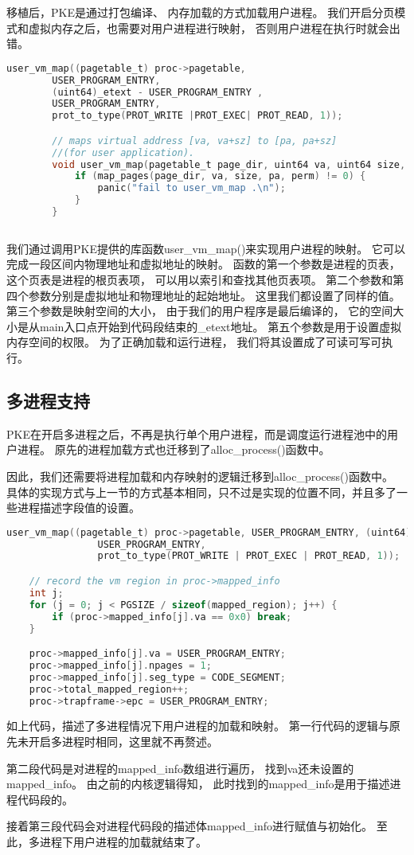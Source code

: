 移植后，PKE是通过打包编译、
内存加载的方式加载用户进程。
我们开启分页模式和虚拟内存之后，也需要对用户进程进行映射，
否则用户进程在执行时就会出错。

\begin{lstlisting}[caption={用户进程地址映射}, label={lst:user_process_map}, language=C]
    user_vm_map((pagetable_t) proc->pagetable,
        USER_PROGRAM_ENTRY, 
        (uint64)_etext - USER_PROGRAM_ENTRY ,
        USER_PROGRAM_ENTRY,
        prot_to_type(PROT_WRITE |PROT_EXEC| PROT_READ, 1)); 

        // maps virtual address [va, va+sz] to [pa, pa+sz] 
        //(for user application).
        void user_vm_map(pagetable_t page_dir, uint64 va, uint64 size, uint64 pa, int perm) {
            if (map_pages(page_dir, va, size, pa, perm) != 0) {
                panic("fail to user_vm_map .\n");
            }
        }
               
\end{lstlisting}

我们通过调用PKE提供的库函数user\_vm\_map()来实现用户进程的映射。
它可以完成一段区间内物理地址和虚拟地址的映射。
函数的第一个参数是进程的页表，这个页表是进程的根页表项，
可以用以索引和查找其他页表项。
第二个参数和第四个参数分别是虚拟地址和物理地址的起始地址。
这里我们都设置了同样的值。
第三个参数是映射空间的大小，
由于我们的用户程序是最后编译的，
它的空间大小是从main入口点开始到代码段结束的\_etext地址。
第五个参数是用于设置虚拟内存空间的权限。
为了正确加载和运行进程，
我们将其设置成了可读可写可执行。


\subsection{多进程支持}

PKE在开启多进程之后，不再是执行单个用户进程，而是调度运行进程池中的用户进程。
原先的进程加载方式也迁移到了alloc\_process()函数中。

因此，我们还需要将进程加载和内存映射的逻辑迁移到alloc\_process()函数中。
具体的实现方式与上一节的方式基本相同，只不过是实现的位置不同，并且多了一些进程描述字段值的设置。

\begin{lstlisting}[caption={多进程情况下用户进程的加载和映射}, label={lst:user_process_map_multi}, language=C]
    user_vm_map((pagetable_t) proc->pagetable, USER_PROGRAM_ENTRY, (uint64) _etext - USER_PROGRAM_ENTRY,
                USER_PROGRAM_ENTRY,
                prot_to_type(PROT_WRITE | PROT_EXEC | PROT_READ, 1));

    // record the vm region in proc->mapped_info
    int j;
    for (j = 0; j < PGSIZE / sizeof(mapped_region); j++) {
        if (proc->mapped_info[j].va == 0x0) break;
    }

    proc->mapped_info[j].va = USER_PROGRAM_ENTRY;
    proc->mapped_info[j].npages = 1;
    proc->mapped_info[j].seg_type = CODE_SEGMENT;
    proc->total_mapped_region++;
    proc->trapframe->epc = USER_PROGRAM_ENTRY;    
\end{lstlisting}

如上代码，描述了多进程情况下用户进程的加载和映射。
第一行代码的逻辑与原先未开启多进程时相同，这里就不再赘述。

第二段代码是对进程的mapped\_info数组进行遍历，
找到va还未设置的mapped\_info。
由之前的内核逻辑得知，
此时找到的mapped\_info是用于描述进程代码段的。

接着第三段代码会对进程代码段的描述体mapped\_info进行赋值与初始化。
至此，多进程下用户进程的加载就结束了。


